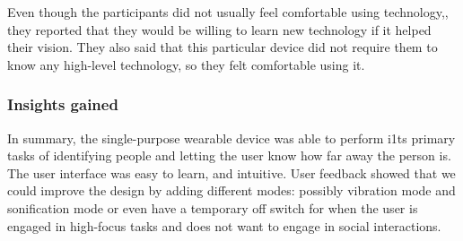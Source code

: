 

Even though the participants did not usually feel comfortable using technology,, they reported that they would be willing to learn new technology if it helped their vision. They also said that this particular device did not require them to know any high-level technology, so they felt comfortable using it.





\subsubsection{Insights gained}
 
In summary, the single-purpose wearable device was able to perform i1ts primary tasks of identifying people and letting the user know how far away the person is. The user interface was easy to learn, and intuitive. User feedback showed that we could improve the design by adding different modes: possibly vibration mode and sonification mode or even have a temporary off switch for when the user is engaged in high-focus tasks and does not want to engage in social interactions. 



